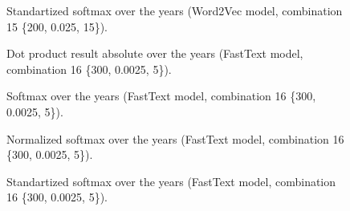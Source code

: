 \documentclass[10pt,letterpaper]{article}
\begin{document}
\begin{figure}[!ht]
    \centering
    \caption{Standartized softmax over the years (Word2Vec model, combination 15 \{200, 0.025, 15\}).}
    \label{fig:softmax_standartization_w2v_comb15}
\end{figure}

\begin{figure}[!ht]
    \centering
    \caption{Dot product result absolute over the years (FastText model, combination 16 \{300, 0.0025, 5\}).}
    \label{fig:dp_absolute_ft_comb16}
\end{figure}

\begin{figure}[!ht]
    \centering
    \caption{Softmax over the years (FastText model, combination 16 \{300, 0.0025, 5\}).}
    \label{fig:softmax_ft_comb16}
\end{figure}

\begin{figure}[!ht]
    \centering
    \caption{Normalized softmax over the years (FastText model, combination 16 \{300, 0.0025, 5\}).}
    \label{fig:softmax_normalization_ft_comb16}
\end{figure}

\begin{figure}[!ht]
    \centering
    \caption{Standartized softmax over the years (FastText model, combination 16 \{300, 0.0025, 5\}).}
    \label{fig:softmax_standartization_ft_comb16}
\end{figure}
\end{document}
